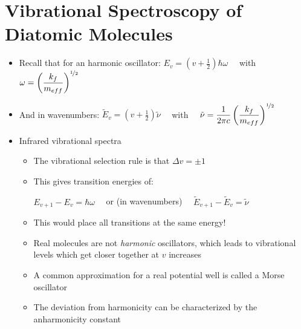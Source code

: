 \documentclass[12pt, openany, letterpaper]{memoir}
\begin{document}
\section{Vibrational Spectroscopy of Diatomic Molecules}
\begin{itemize}	
	\item Recall that for an harmonic oscillator: $E_v=\left(v+\frac{1}{2}\right)\hbar\omega$ ~~with~~ $\omega = \left(\dfrac{k_f}{m_{eff}}\right)^{\nicefrac{1}{2}}$
	\item And in wavenumbers: $\tilde{E}_v=\left(v+\frac{1}{2}\right)\tilde{\nu}$ ~~with~~ $\tilde{\nu} = \dfrac{1}{2\pi c}\left(\dfrac{k_f}{m_{eff}}\right)^{\nicefrac{1}{2}}$
	\item Infrared vibrational spectra
	\begin{itemize}
		\item The vibrational selection rule is that $\Delta v=\pm 1$
		\item This gives transition energies of:
		
		$E_{v+1}-E_{v} = \hbar\omega$ ~~or (in wavenumbers)~~ $\tilde{E}_{v+1}-\tilde{E}_v = \tilde{\nu}$
		\item This would place all transitions at the same energy!
		\item Real molecules are not \emph{harmonic} oscillators, which leads to vibrational levels which get closer together at $v$ increases
		\item A common approximation for a real potential well is called a Morse oscillator
		\item The deviation from harmonicity can be characterized by the anharmonicity constant
		

\end{itemize}
\end{itemize}
\end{document}

